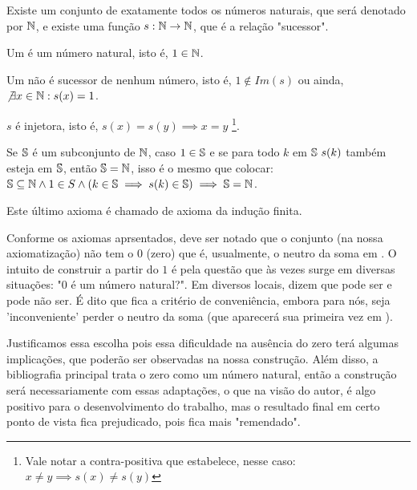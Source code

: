 \documentclass[../main.tex]{subfiles}
\begin{document}
\begin{axi}\label{axi-existe-n-s}
    Existe um conjunto de exatamente todos os números naturais, que será denotado por $\N$, e existe uma função $s: \N \rightarrow \N$, que é a relação "sucessor". 
\end{axi} %
\begin{axi}\label{axi-um-natural}
    Um é um número natural, isto é, $1 \in \N$.
\end{axi}
\begin{axi}\label{axi-um-nao-sucessor}
    Um não é sucessor de nenhum número, isto é, $1 \not \in Im(s)$ ou ainda, $\not \exists x \in \N : s(x) = 1$.
\end{axi}
\begin{axi}\label{axi-s-injetora}
    $s$ é injetora, isto é, $s(x) = s(y) \implies x = y$ \footnote{Vale notar a contra-positiva que estabelece, nesse caso: $x \neq y \implies s(x) \neq s(y)$}.
\end{axi}
\begin{axi}\label{axi-ind-finita}
    Se $\S$ é um subconjunto de $\N$, caso $1 \in \S$ e se para todo $k$ em $\S\ s(k)$ também esteja em $\S$, então $\S = \N$, isso é o mesmo que colocar:
     $\S \subseteq \N \land 1 \in S \land ( k \in \S \implies s(k) \in \S) \implies \S = \N$.
\end{axi}
Este último axioma é chamado de axioma da indução finita.

Conforme os axiomas aprsentados, deve ser notado que o conjunto \N (na nossa axiomatização) não tem o $0$ (zero) que é, usualmente, o neutro da soma em \N. O intuito de construir a partir do $1$ é pela questão que às vezes surge em diversas situações: "$0$ é um número natural?". Em diversos locais, dizem que pode ser e pode não ser. É dito que fica a critério de conveniência, embora para nós, seja 'inconveniente' perder o neutro da soma (que aparecerá sua primeira vez em \Z). 

Justificamos essa escolha pois essa dificuldade na ausência do zero terá algumas implicações, que poderão ser observadas na nossa construção. Além disso, a bibliografia principal trata o zero como um número natural, então a construção será necessariamente com essas adaptações, o que na visão do autor, é algo positivo para o desenvolvimento do trabalho, mas o resultado final em certo ponto de vista fica prejudicado, pois fica mais "remendado".
\end{document}
